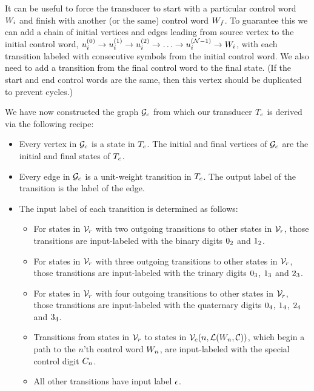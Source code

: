 \documentclass[english]{article}
\begin{document}
It can be useful to force the transducer to start with a particular control word $W_i$
and finish with another (or the same) control word $W_f$.
To guarantee this we can add a chain of initial vertices and edges leading from source vertex to the initial control word,
$u^{(0)}_i \to u^{(1)}_i \to u^{(2)}_i \to \ldots \to u^{({\cal N}-1)}_i \to W_i$,
with each transition labeled with consecutive symbols from the initial control word.
We also need to add a transition from the final control word to the final state.
(If the start and end control words are the same, then this vertex should be duplicated to prevent cycles.)

We have now constructed the graph ${\cal G}_c$ from which our transducer $T_c$
is derived via the following recipe:
\begin{itemize}
\item Every vertex in ${\cal G}_c$ is a state in $T_c$.
The initial and final vertices of ${\cal G}_c$ are the initial and final states of $T_c$.
\item Every edge in ${\cal G}_c$ is a unit-weight transition in $T_c$.
The output label of the transition is the label of the edge.
\item The input label of each transition is determined as follows:
\begin{itemize}
\item For states in ${\cal V}_r$ with two outgoing transitions to other states in ${\cal V}_r$, those transitions are input-labeled with the binary digits $0_2$ and $1_2$.
\item For states in ${\cal V}_r$ with three outgoing transitions to other states in ${\cal V}_r$, those transitions are input-labeled with the trinary digits $0_3$, $1_3$ and $2_3$.
\item For states in ${\cal V}_r$ with four outgoing transitions to other states in ${\cal V}_r$, those transitions are input-labeled with the quaternary digits $0_4$, $1_4$, $2_4$ and $3_4$.
\item Transitions from states in ${\cal V}_r$ to states in ${\cal V}_c(n,{\cal L}(W_n,{\cal C}))$,
which begin a path to the $n$'th control word $W_n$,
are input-labeled with the special control digit $C_{n}$.
\item All other transitions have input label $\epsilon$.
\end{itemize}
\end{itemize}
\end{document}
